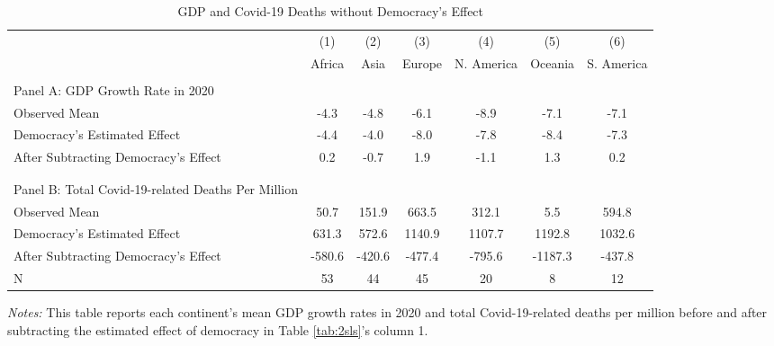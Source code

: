 
\begin{table}[!htbp] \centering
  \caption{GDP and Covid-19 Deaths without Democracy's Effect}
  \label{tab:remove-democracy-effect} 
  \footnotesize
  \begin{threeparttable}
\begin{tabular}{l*{6}{c}}
\hline\hline
                    &\multicolumn{1}{c}{(1)}&\multicolumn{1}{c}{(2)}&\multicolumn{1}{c}{(3)}&\multicolumn{1}{c}{(4)}&\multicolumn{1}{c}{(5)}&\multicolumn{1}{c}{(6)}\\
                    &      Africa&        Asia&      Europe&N. America&     Oceania&S. America\\
 \hline \\[-1.8ex]
 Panel A: GDP Growth Rate in 2020 & & & & & \\
 \hspace{3mm} Observed Mean &        -4.3&        -4.8&        -6.1&        -8.9&        -7.1&        -7.1\\
\hspace{3mm} Democracy's Estimated Effect  &        -4.4&        -4.0&        -8.0&        -7.8&        -8.4&        -7.3\\
 \hspace{3mm} After Subtracting Democracy's Effect&         0.2&        -0.7&         1.9&        -1.1&         1.3&         0.2\\ \\[-1.8ex] \hline \\[-1.8ex]
 Panel B: Total Covid-19-related Deaths Per Million & & & & & \\
\hspace{3mm} Observed Mean &        50.7&       151.9&       663.5&       312.1&         5.5&       594.8\\
\hspace{3mm} Democracy's Estimated Effect  &       631.3&       572.6&      1140.9&      1107.7&      1192.8&      1032.6\\
\hspace{3mm} After Subtracting Democracy's Effect&      -580.6&      -420.6&      -477.4&      -795.6&     -1187.3&      -437.8\\

\hline
N        &          53&          44&          45&          20&           8&          12\\
\hline\hline
\end{tabular}
\begin{tablenotes} 
\item {\footnotesize {\textit{Notes:} This table reports each continent's mean GDP growth rates in 2020 and total Covid-19-related deaths per million before and after subtracting the estimated effect of democracy in Table \ref{tab:2sls}'s column 1.}}
\end{tablenotes}
\end{threeparttable}
\end{table} 

